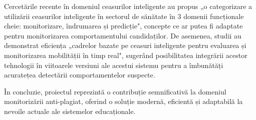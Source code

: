 \documentclass[12pt,a4paper]{article}
\begin{document}
Cercetările recente în domeniul ceasurilor inteligente au propus „o categorizare a utilizării ceasurilor 
inteligente în sectorul de sănătate în 3 domenii funcționale cheie: monitorizare, îndrumarea și 
predicție"\cite{moshawrab2023value}, concepte ce ar putea fi adaptate pentru monitorizarea 
comportamentului candidaților. De asemenea, studii au demonstrat eficiența „cadrelor bazate pe ceasuri 
inteligente pentru evaluarea și monitorizarea mobilității în timp real"\cite{kheirkhahan2018smartwatch}, 
sugerând posibilitatea integrării acestor tehnologii în viitoarele versiuni ale acestui sistemu pentru 
a îmbunătăți acuratețea detectării comportamentelor suspecte. \cite{brainard2018massive}

În concluzie, proiectul reprezintă o contribuție semnificativă la domeniul monitorizării anti-plagiat, oferind o soluție modernă, eficientă și adaptabilă la nevoile actuale ale sistemelor educaționale.

\newpage
\printbibliography[heading=bibintoc, title={Bibliografie}]
\end{document}
